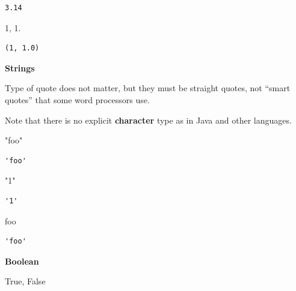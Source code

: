 \documentclass[
  letterpaper,
  DIV=11,
  numbers=noendperiod]{scrreprt}
\newenvironment{Shaded}{\begin{snugshade}}{\end{snugshade}}
\newcommand{\CommentTok}[1]{\textcolor[rgb]{0.37,0.37,0.37}{#1}}
\newcommand{\DecValTok}[1]{\textcolor[rgb]{0.68,0.00,0.00}{#1}}
\newcommand{\FloatTok}[1]{\textcolor[rgb]{0.68,0.00,0.00}{#1}}
\newcommand{\NormalTok}[1]{\textcolor[rgb]{0.00,0.23,0.31}{#1}}
\newcommand{\VariableTok}[1]{\textcolor[rgb]{0.07,0.07,0.07}{#1}}
\begin{document}
\begin{verbatim}
3.14
\end{verbatim}

\begin{Shaded}
\begin{Highlighting}[]
\DecValTok{1}\NormalTok{, }\FloatTok{1.}
\end{Highlighting}
\end{Shaded}

\begin{verbatim}
(1, 1.0)
\end{verbatim}

\textbf{Strings}

Type of quote does not matter, but they must be straight quotes, not
``smart quotes'' that some word processors use.

Note that there is no explicit \textbf{character} type as in Java and
other languages.

\begin{Shaded}
\begin{Highlighting}[]
\CommentTok{"foo"} 
\end{Highlighting}
\end{Shaded}

\begin{verbatim}
'foo'
\end{verbatim}

\begin{Shaded}
\begin{Highlighting}[]
\CommentTok{"1"}
\end{Highlighting}
\end{Shaded}

\begin{verbatim}
'1'
\end{verbatim}

\begin{Shaded}
\begin{Highlighting}[]
\CommentTok{\textquotesingle{}foo\textquotesingle{}}
\end{Highlighting}
\end{Shaded}

\begin{verbatim}
'foo'
\end{verbatim}

\textbf{Boolean}

\begin{Shaded}
\begin{Highlighting}[]
\VariableTok{True}\NormalTok{, }\VariableTok{False}
\end{Highlighting}
\end{Shaded}
\end{document}
